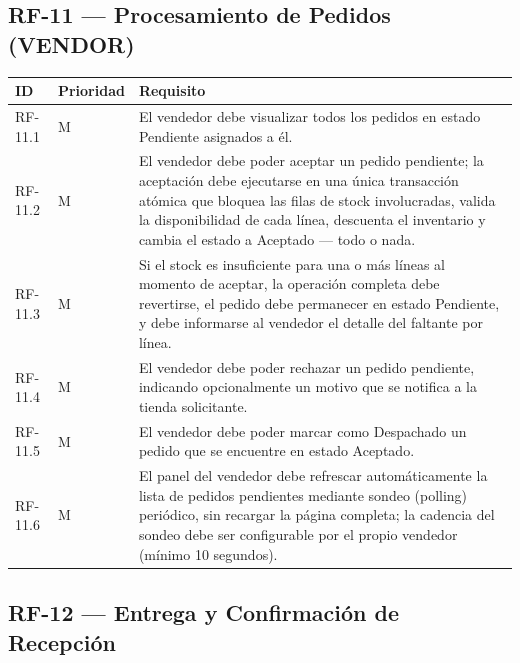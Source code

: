 \documentclass[12pt,a4paper]{report}
\begin{document}
\subsection{RF-11 --- Procesamiento de Pedidos (VENDOR)}

\begin{longtable}{|p{2cm}|p{2cm}|p{10cm}|}
\hline
\textbf{ID} & \textbf{Prioridad} & \textbf{Requisito} \\ \hline
RF-11.1 & M & El vendedor debe visualizar todos los pedidos en estado Pendiente asignados a él. \\ \hline
RF-11.2 & M & El vendedor debe poder aceptar un pedido pendiente; la aceptación debe ejecutarse en una única transacción atómica que bloquea las filas de stock involucradas, valida la disponibilidad de cada línea, descuenta el inventario y cambia el estado a Aceptado — todo o nada. \\ \hline
RF-11.3 & M & Si el stock es insuficiente para una o más líneas al momento de aceptar, la operación completa debe revertirse, el pedido debe permanecer en estado Pendiente, y debe informarse al vendedor el detalle del faltante por línea. \\ \hline
RF-11.4 & M & El vendedor debe poder rechazar un pedido pendiente, indicando opcionalmente un motivo que se notifica a la tienda solicitante. \\ \hline
RF-11.5 & M & El vendedor debe poder marcar como Despachado un pedido que se encuentre en estado Aceptado. \\ \hline
RF-11.6 & M & El panel del vendedor debe refrescar automáticamente la lista de pedidos pendientes mediante sondeo (polling) periódico, sin recargar la página completa; la cadencia del sondeo debe ser configurable por el propio vendedor (mínimo 10 segundos). \\ \hline
\end{longtable}

\subsection{RF-12 --- Entrega y Confirmación de Recepción}
\end{document}
